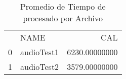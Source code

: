 \begin{table}
\caption{Promedio de Tiempo de procesado por Archivo}
\begin{tabular}{llr}
 & NAME & CAL \\
0 & audioTest1 & 6230.00000000 \\
1 & audioTest2 & 3579.00000000 \\
\end{tabular}
\end{table}
